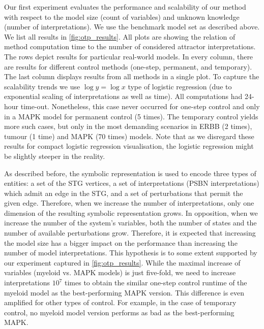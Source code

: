 Our first experiment evaluates the performance and scalability of our method with respect to the model size (count of variables) and unknown knowledge (number of interpretations). We use the benchmark model set as described above. We list all results in \autoref{fig:otp_results}. All plots are showing the relation of method computation time to the number of considered attractor interpretations. The rows depict results for particular real-world models. In every column, there are results for different control methods (one-step, permanent, and temporary). The last column displays results from all methods in a single plot. To capture the scalability trends we use $\log y = \log x$ type of logistic regression (due to exponential scaling of interpretations as well as time). All computations had 24-hour time-out. Nonetheless, this case never occurred for one-step control and only in a MAPK model for permanent control (5 times). The temporary control yields more such cases, but only in the most demanding scenarios in ERBB (2 times), tumour (1 time) and MAPK (70 times) models. Note that as we disregard these results for compact logistic regression visualisation, the logistic regression might be slightly steeper in the reality.


As described before, the symbolic representation is used to encode three types of entities: a set of the STG vertices, a set of interpretations (PSBN interpretations) which admit an edge in the STG, and a set of perturbations that permit the given edge. Therefore, when we increase the number of interpretations, only one dimension of the resulting symbolic representation grows. In opposition, when we increase the number of the system's variables, both the number of states and the number of available perturbations grow. Therefore, it is expected that increasing the model size has a bigger impact on the performance than increasing the number of model interpretations. This hypothesis is to some extent supported by our experiment captured in \autoref{fig:otp_results}. While the maximal increase of variables (myeloid vs. MAPK models) is just five-fold, we need to increase interpretations $10^7$ times to obtain the similar one-step control runtime of the myeloid model as the best-performing MAPK version. This difference is even amplified for other types of control. For example, in the case of temporary control, no myeloid model version performs as bad as the best-performing MAPK. 

